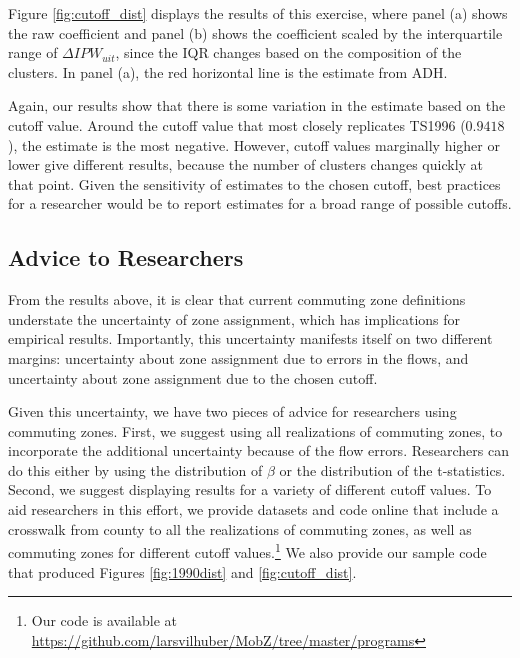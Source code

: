Figure \ref{fig:cutoff_dist} displays the results of this exercise, where panel (a) shows the raw coefficient and panel (b) shows the coefficient scaled by the interquartile range of $\Delta IPW_{uit}$, since the IQR changes based on the composition of the clusters. In panel (a),  the red horizontal line is the estimate from ADH.

Again, our results show that there is some variation in the estimate based on the cutoff value. Around the cutoff value that most closely replicates TS1996 ($0.9418$), the estimate is the most negative. However, cutoff values marginally higher or lower give different results, because the number of clusters changes quickly at that point. Given the sensitivity of estimates to the chosen cutoff, best practices for a researcher would be to report estimates for a broad range of possible cutoffs.	

\subsection{Advice to Researchers}

From the results above, it is clear that current commuting zone definitions understate the uncertainty of zone assignment, which has implications for empirical results. Importantly, this uncertainty manifests itself on two different margins: uncertainty about zone assignment due to errors in the flows, and uncertainty about zone assignment due to the chosen cutoff. 

Given this uncertainty, we have two pieces of advice for researchers using commuting zones. First, we suggest using all realizations of commuting zones, to incorporate the additional uncertainty because of the flow errors. Researchers can do this either by using the distribution of $\beta$ or the distribution of the t-statistics. Second, we suggest displaying results for a variety of different cutoff values. To aid researchers in this effort, we provide datasets and code online that include a crosswalk from county to all the realizations of commuting zones, as well as commuting zones for different cutoff values.\footnote{Our code is available at \url{https://github.com/larsvilhuber/MobZ/tree/master/programs}} We also provide our sample code that produced Figures \ref{fig:1990dist} and \ref{fig:cutoff_dist}.



